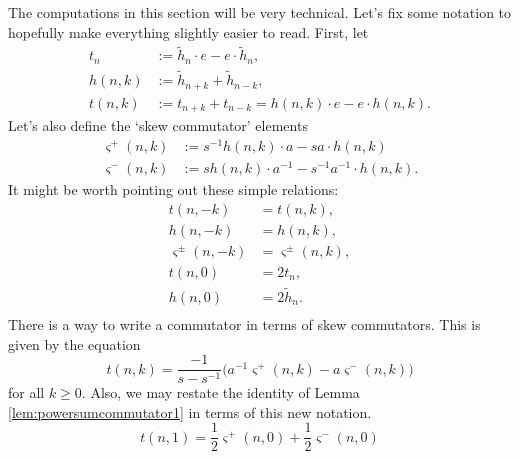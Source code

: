 The computations in this section will be very technical. Let's fix some notation to hopefully make everything slightly easier to read. First, let
\begin{align*}
t_n &:= \tilde{h}_n \cdot e - e  \cdot \tilde{h}_n, \\
h(n, k) &:= \tilde{h}_{n+k} + \tilde{h}_{n-k}, \\
t(n, k) &:= t_{n+k} + t_{n-k} = h(n, k) \cdot e - e \cdot h(n, k).
\end{align*}
Let's also define the `skew commutator' elements
\begin{align*}
\varsigma^+ (n, k) &:= s^{-1} h(n, k) \cdot a - s a \cdot h(n, k) \\
\varsigma^- (n, k) &:=  s h(n, k) \cdot a^{-1} - s^{-1} a^{-1} \cdot h(n, k).
\end{align*}
It might be worth pointing out these simple relations: 
\begin{equation}
\begin{split}
t(n, -k) &= t(n, k), \\
h(n, -k) &= h(n, k), \\
\varsigma^\pm (n, -k) &= \varsigma^\pm (n, k), \\
t(n, 0) &= 2 t_n, \\
h(n, 0) &= 2 \tilde{h}_n. \\
\end{split}
\end{equation}
There is a way to write a commutator in terms of skew commutators. This is given by the equation
\begin{equation} \label{eq:skewcommutator3}
t(n, k) = \frac{-1}{s-s^{-1}} \big( a^{-1} \varsigma^+(n, k) - a \varsigma^-(n, k) \big)
\end{equation}
for all $k \geq 0$. Also, we may restate the identity of Lemma \ref{lem:powersumcommutator1} in terms of this new notation.
\begin{equation} \label{eq:skewcommutator2}
t(n, 1) = \frac{1}{2} \varsigma^+ (n, 0) + \frac{1}{2} \varsigma^- (n, 0)
\end{equation}

